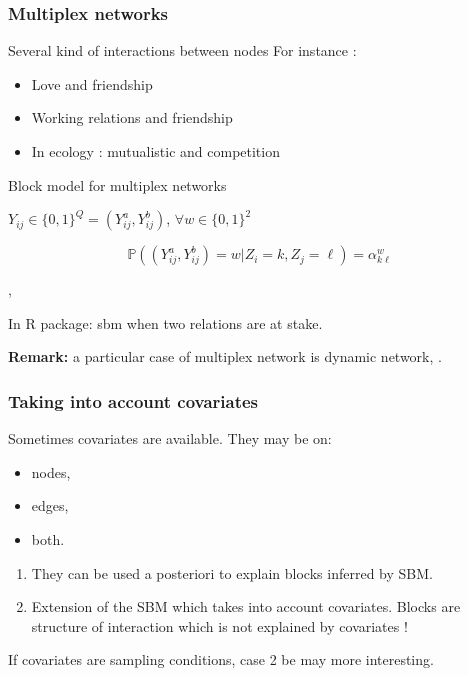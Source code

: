 \documentclass[compress,10pt]{beamer}
\begin{document}
\begin{frame} \frametitle{Multiplex networks}
Several kind of interactions between nodes
For instance : 


\begin{itemize}
\item Love and friendship
\item Working relations and friendship
\item  In ecology : mutualistic and competition
\end{itemize}


\begin{block}{Block model for multiplex networks}

$Y_{ij} \in \{0,1\} ^ Q = (Y_{ij}^a, Y_{ij}^b)$, $\forall w \in \{0,1\}^2$ 



$$\mathbb{P}((Y^a_{ij},Y^b_{ij}) = w  | Z_i  = k, Z_j = \ell)  = \alpha^w _{k\ell}$$

\end{block}

\textcolor{mygreen}{
\cite{kefi}, \cite{barbillon2017stochastic}}

In \textcolor{mygreen}{R package: sbm} when two relations are at stake.
 

 \textbf{Remark:} a particular case of multiplex network is dynamic network, \textcolor{mygreen}{\cite{matias2017statistical}}.
 

 \end{frame}
\begin{frame}\frametitle{Taking into account covariates}
 Sometimes covariates are available. They may be on:
 \begin{itemize}
  \item nodes,
  \item edges,
  \item both.
 \end{itemize}

 
 
 \begin{enumerate}
  \item They can be used a posteriori to explain blocks inferred by SBM.
  \item Extension of the SBM which takes into account covariates. Blocks are structure of interaction which is not 
  explained by covariates !

 \end{enumerate}


 If covariates are sampling conditions, case 2  be  may more interesting.
 
\end{frame}
\end{document}
